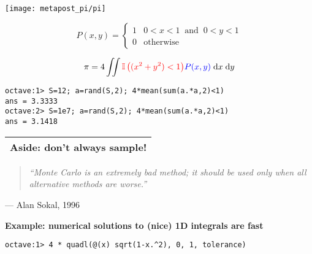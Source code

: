 \documentclass[25pt,landscape]{foils}
\newcommand{\Red}{\textcolor{red}}
\newcommand{\Blue}{\textcolor{blue}}
\newcommand{\Gray}{\textcolor{mygray}}
\newcommand{\Green}{\textcolor{mypine}}
\newcommand{\myfoilhead}[1]{
\newpage
\vspace*{-1cm}
\Gray{
\begin{tabular*}{\textwidth}{l}
{\bf \Huge #1} \\
\bottomrule
\end{tabular*}}}
\begin{document}
\vfill

\begin{minipage}{0.4\linewidth}
    \texttt{[image: metapost\_pi/pi]}
\end{minipage}
\begin{minipage}{0.6\linewidth}
    \[
    P(x,y) = \begin{cases}1 & 0\!<\!x\!<\!1 ~\mbox{ and }~ 0\!<\!y\!<\!1\\
        0 & \mbox{otherwise}
    \end{cases}
    \]

\bigskip

    \[
    \pi = 4 \iint \Red{{\mathbb I}\left((x^2+y^2)<1\right)} \Blue{P(x,y)} \;\mathrm{d}x\;\mathrm{d}y
    \]
\end{minipage}

\vfill

\begin{verbatim}
octave:1> S=12; a=rand(S,2); 4*mean(sum(a.*a,2)<1)
ans = 3.3333
octave:2> S=1e7; a=rand(S,2); 4*mean(sum(a.*a,2)<1)
ans = 3.1418
\end{verbatim}

\myfoilhead{Aside: don't always sample!}

\vfill

\begin{quote}
\textsl{``Monte Carlo is an extremely bad method; it should be used only when all
alternative methods are worse.''}
\end{quote}
\vspace*{-0.2in}
\begin{flushright}
    --- Alan Sokal, 1996
\end{flushright}

\vfill

\Green{\bf Example: numerical solutions to (nice) 1D integrals are fast}


\bigskip

\begin{verbatim}
octave:1> 4 * quadl(@(x) sqrt(1-x.^2), 0, 1, tolerance)
\end{verbatim}
\end{document}
